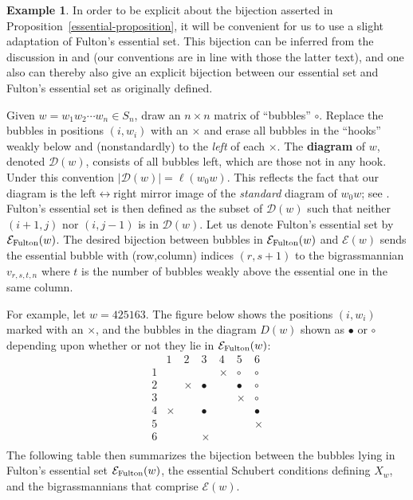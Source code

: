 \documentclass[12pt,dvips]{amsart}
\theoremstyle{plain}
\theoremstyle{definition}
\newtheorem{example}[theorem]{Example}
\theoremstyle{remark}
\numberwithin{equation}{section}
\def\Ess{{\mathcal{E}}}
\begin{document}
\begin{example}
\label{exa:essential_convention}
In order to be explicit about the bijection asserted in
Proposition~\ref{essential-proposition}, it will be convenient for us
to use a slight adaptation of Fulton's essential set. This bijection
can be inferred from the discussion in \cite{FultonPragacz} and
\cite{GasharovReiner} (our conventions are in line with those the
latter text), and one also can thereby also give an explicit bijection
between our essential set and Fulton's essential set as originally
defined.

Given $w=w_1 w_2 \cdots w_n\in S_n$, draw an $n\times n$ matrix of ``bubbles'' $\circ$.  Replace
the bubbles in positions $(i, w_i)$ with an $\times$ and erase all bubbles in the ``hooks'' 
weakly below and (nonstandardly) to the \emph{left} of each $\times$. The 
{\bf diagram} of $w$, denoted ${\mathcal D}(w)$, consists of all bubbles left, which are those not in any hook. 
Under this convention $|{\mathcal D}(w)|=\ell(w_0 w)$. This reflects the fact that our diagram is
the left$\leftrightarrow$right mirror image of the \emph{standard} diagram of $w_0 w$;
see \cite[p.11]{FultonPragacz}. 
Fulton's essential set is then defined as the subset of ${\mathcal D}(w)$ such that
neither $(i+1,j)$ nor $(i,j-1)$ is in ${\mathcal D}(w)$. Let us denote Fulton's essential
set by $\Ess_{\rm Fulton}(w)$.  The desired bijection between bubbles in $\Ess_{\rm Fulton}(w)$
and $\Ess(w)$ sends the essential bubble with (row,column) indices $(r,s+1)$ to the
bigrassmannian $v_{r,s,t,n}$ where $t$ is the number of bubbles weakly above the essential
one in the same column.

For example, let $w=425163$. The figure below shows the positions $(i,w_i)$ marked with an $\times$,
and the bubbles in the diagram $D(w)$ shown as $\bullet$ or $\circ$ depending upon whether or not
they lie in $\Ess_{\rm Fulton}(w)$:
$$
\begin{matrix}
 &1&2&3&4&5&6 \\
1& & & &\times&\circ&\circ\\
2& &\times&\bullet& &\bullet&\circ\\
3& & & & &\times&\circ\\
4&\times& &\bullet& & &\bullet\\
5& & & & & &\times\\
6& & &\times& & & \\
\end{matrix}
$$
The following table then summarizes the bijection between the bubbles lying in Fulton's
essential set $\Ess_{\rm Fulton}(w)$, the essential Schubert conditions defining $X_w$,
and the bigrassmannians that comprise $\Ess(w)$.


\end{example}
\end{document}

